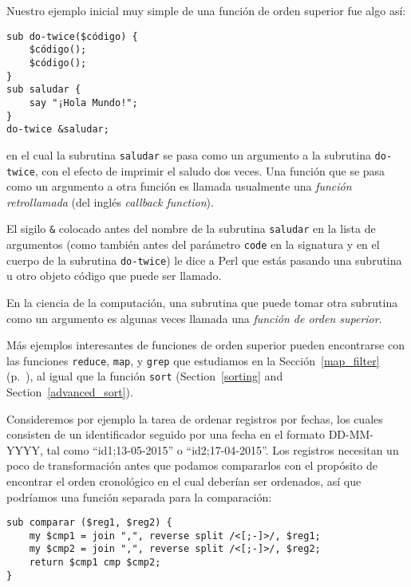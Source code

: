 Nuestro ejemplo inicial muy simple de una función de orden 
superior fue algo así:

\begin{verbatim}
sub do-twice($código) {
	$código();
	$código();
}
sub saludar {
    say "¡Hola Mundo!";
}
do-twice &saludar;
\end{verbatim}

en el cual la subrutina {\tt saludar} se pasa como un 
argumento a la subrutina {\tt do-twice}, con el efecto
de imprimir el saludo dos veces. Una función que se pasa
como un argumento a otra función es llamada usualmente
una \emph{función retrollamada} (del inglés \emph{callback function}).

El sigilo \verb|&| colocado antes del nombre de la subrutina {\tt saludar}
en la lista de argumentos (como también antes del parámetro 
{\tt code} en la signatura y en el cuerpo de la subrutina {\tt do-twice})
le dice a Perl que estás pasando una subrutina u otro
objeto código que puede ser llamado.
\ifplastex \else
{}
\fi

En la ciencia de la computación, una subrutina que puede tomar
otra subrutina como un argumento es algunas veces llamada
una \emph{función de orden superior}.

Más ejemplos interesantes de funciones de orden superior
pueden encontrarse con las funciones {\tt reduce}, {\tt map}, y
{\tt grep} que estudiamos en la Sección~\ref{map_filter} 
(p.~\pageref{map_filter}), al igual que la función {\tt sort}
(Section~\ref{sorting} and Section~\ref{advanced_sort}).

Consideremos por ejemplo la tarea de ordenar registros por fechas,
los cuales consisten de un identificador seguido por una fecha
en el formato DD-MM-YYYY, tal como ``id1;13-05-2015'' o ``id2;17-04-2015''.
Los registros necesitan un poco de transformación antes
que podamos compararlos con el propósito de encontrar el orden
cronológico en el cual deberían ser ordenados, así que podríamos
una función separada para la comparación:

\begin{verbatim}
sub comparar ($reg1, $reg2) {
    my $cmp1 = join ",", reverse split /<[;-]>/, $reg1;
    my $cmp2 = join ",", reverse split /<[;-]>/, $reg2;
    return $cmp1 cmp $cmp2;
}   
\end{verbatim}

